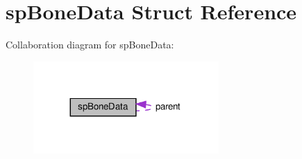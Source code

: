 \hypertarget{structspBoneData}{}\section{sp\+Bone\+Data Struct Reference}
\label{structspBoneData}


Collaboration diagram for sp\+Bone\+Data\+:
\nopagebreak
\begin{figure}[H]
\begin{center}
\leavevmode
\includegraphics[width=200pt]{structspBoneData__coll__graph}
\end{center}
\end{figure}
